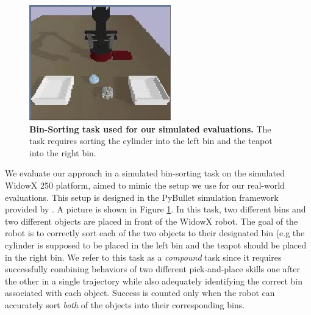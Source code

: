 \documentclass[conference]{IEEEtran}
\begin{document}
\begin{figure}{}
\centering
    \includegraphics[width=0.8\linewidth]{binsort_figure.jpg}
  \caption{\footnotesize{\textbf{Bin-Sorting task used for our simulated evaluations.} The task requires sorting the cylinder into the left bin and the teapot into the right bin.}}
  \label{app:sim_setup}
\end{figure}

We evaluate our approach in a simulated bin-sorting task on the simulated WidowX 250 platform, aimed to mimic the setup we use for our real-world evaluations. This setup is designed in the PyBullet simulation framework provided by \citet{singh2020cog}. A picture is shown in Figure \ref{app:sim_setup}. In this task, two different bins and two different objects are placed in front of the WidowX robot. The goal of the robot is to correctly sort each of the two objects to their designated bin (e.g the cylinder is supposed to be placed in the left bin and the teapot should be placed in the right bin. We refer to this task as a \emph{compound} task since it requires successfully combining behaviors of two different pick-and-place skills one after the other in a single trajectory while also adequately identifying the correct bin associated with each object. Success is counted only when the robot can accurately sort \emph{both} of the objects into their corresponding bins.
\end{document}
